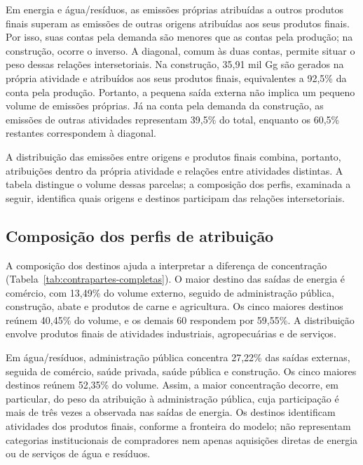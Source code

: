 Em energia e água/resíduos, as emissões próprias atribuídas a outros produtos finais superam as emissões de outras origens atribuídas aos seus produtos finais. Por isso, suas contas pela demanda são menores que as contas pela produção; na construção, ocorre o inverso. A diagonal, comum às duas contas, permite situar o peso dessas relações intersetoriais. Na construção, 35,91 mil Gg são gerados na própria atividade e atribuídos aos seus produtos finais, equivalentes a 92,5\% da conta pela produção. Portanto, a pequena saída externa não implica um pequeno volume de emissões próprias. Já na conta pela demanda da construção, as emissões de outras atividades representam 39,5\% do total, enquanto os 60,5\% restantes correspondem à diagonal.

A distribuição das emissões entre origens e produtos finais combina, portanto, atribuições dentro da própria atividade e relações entre atividades distintas. A tabela distingue o volume dessas parcelas; a composição dos perfis, examinada a seguir, identifica quais origens e destinos participam das relações intersetoriais.





\subsection{Composição dos perfis de atribuição}
\label{sec:composicao-perfis}

A composição dos destinos ajuda a interpretar a diferença de concentração (Tabela~\ref{tab:contrapartes-completas}). O maior destino das saídas de energia é comércio, com 13,49\% do volume externo, seguido de administração pública, construção, abate e produtos de carne e agricultura. Os cinco maiores destinos reúnem 40,45\% do volume, e os demais 60 respondem por 59,55\%. A distribuição envolve produtos finais de atividades industriais, agropecuárias e de serviços.

Em água/resíduos, administração pública concentra 27,22\% das saídas externas, seguida de comércio, saúde privada, saúde pública e construção. Os cinco maiores destinos reúnem 52,35\% do volume. Assim, a maior concentração decorre, em particular, do peso da atribuição à administração pública, cuja participação é mais de três vezes a observada nas saídas de energia. Os destinos identificam atividades dos produtos finais, conforme a fronteira do modelo; não representam categorias institucionais de compradores nem apenas aquisições diretas de energia ou de serviços de água e resíduos.

